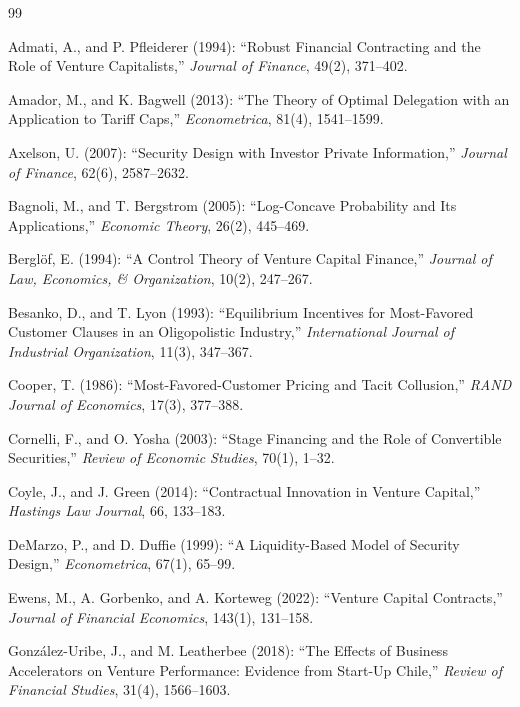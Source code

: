 \documentclass[11pt]{article}
\theoremstyle{definition}
\begin{document}
\begin{thebibliography}{99}

 Admati, A., and P. Pfleiderer (1994): ``Robust Financial Contracting and the Role of Venture Capitalists,'' \emph{Journal of Finance}, 49(2), 371--402.

 Amador, M., and K. Bagwell (2013): ``The Theory of Optimal Delegation with an Application to Tariff Caps,'' \emph{Econometrica}, 81(4), 1541--1599.

 Axelson, U. (2007): ``Security Design with Investor Private Information,'' \emph{Journal of Finance}, 62(6), 2587--2632.

 Bagnoli, M., and T. Bergstrom (2005): ``Log-Concave Probability and Its Applications,'' \emph{Economic Theory}, 26(2), 445--469.

 Bergl\"of, E. (1994): ``A Control Theory of Venture Capital Finance,'' \emph{Journal of Law, Economics, \& Organization}, 10(2), 247--267.

 Besanko, D., and T. Lyon (1993): ``Equilibrium Incentives for Most-Favored Customer Clauses in an Oligopolistic Industry,'' \emph{International Journal of Industrial Organization}, 11(3), 347--367.

 Cooper, T. (1986): ``Most-Favored-Customer Pricing and Tacit Collusion,'' \emph{RAND Journal of Economics}, 17(3), 377--388.

 Cornelli, F., and O. Yosha (2003): ``Stage Financing and the Role of Convertible Securities,'' \emph{Review of Economic Studies}, 70(1), 1--32.

 Coyle, J., and J. Green (2014): ``Contractual Innovation in Venture Capital,'' \emph{Hastings Law Journal}, 66, 133--183.

 DeMarzo, P., and D. Duffie (1999): ``A Liquidity-Based Model of Security Design,'' \emph{Econometrica}, 67(1), 65--99.

 Ewens, M., A. Gorbenko, and A. Korteweg (2022): ``Venture Capital Contracts,'' \emph{Journal of Financial Economics}, 143(1), 131--158.

 Gonz\'alez-Uribe, J., and M. Leatherbee (2018): ``The Effects of Business Accelerators on Venture Performance: Evidence from Start-Up Chile,'' \emph{Review of Financial Studies}, 31(4), 1566--1603.


\end{thebibliography}
\end{document}
